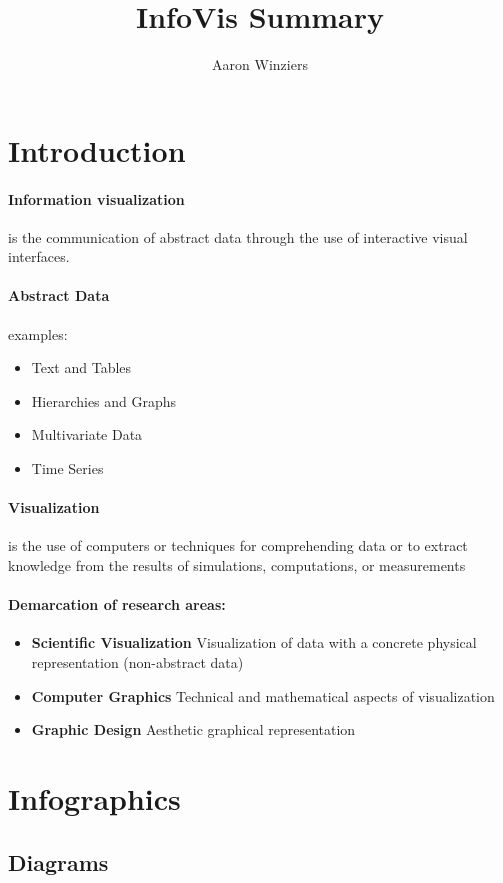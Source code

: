\documentclass[10pt,a4paper]{article}
\author{Aaron Winziers}
\title{InfoVis Summary}
\begin{document}
	\section{Introduction}
		\paragraph{Information visualization} is the communication of abstract data through the use of interactive visual interfaces.
		
		\paragraph{Abstract Data} examples:
			\begin{itemize}
				\item Text and Tables
				\item Hierarchies and Graphs
				\item Multivariate Data
				\item Time Series
			\end{itemize}
		
		\paragraph{Visualization} is the use of computers or techniques for comprehending data or to extract knowledge from the results of simulations, computations, or measurements
		
		\paragraph{Demarcation of research areas:}
			\begin{itemize}
				\item \textbf{Scientific Visualization} Visualization of data with a concrete physical representation (non-abstract data)
				\item \textbf{Computer Graphics} Technical and mathematical aspects of visualization
				\item \textbf{Graphic Design} Aesthetic graphical representation
			\end{itemize}
		
		
	\section{Infographics}
		\subsection{Diagrams}
\end{document}
